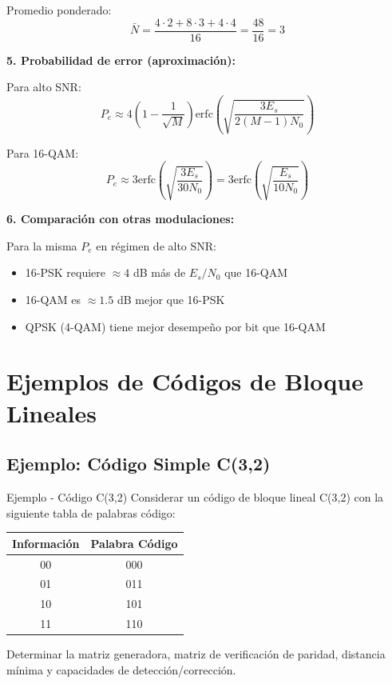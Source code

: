 \documentclass[10pt,a4paper]{article}
\begin{document}
\begin{solucion}
Promedio ponderado:
\[
\bar{N} = \frac{4 \cdot 2 + 8 \cdot 3 + 4 \cdot 4}{16} = \frac{48}{16} = 3
\]

\textbf{5. Probabilidad de error (aproximación):}

Para alto SNR:
\[
P_e \approx 4\left(1 - \frac{1}{\sqrt{M}}\right) \text{erfc}\left(\sqrt{\frac{3E_s}{2(M-1)N_0}}\right)
\]

Para 16-QAM:
\[
\boxed{P_e \approx 3 \text{erfc}\left(\sqrt{\frac{3E_s}{30N_0}}\right) = 3 \text{erfc}\left(\sqrt{\frac{E_s}{10N_0}}\right)}
\]

\textbf{6. Comparación con otras modulaciones:}

Para la misma $P_e$ en régimen de alto SNR:
\begin{itemize}
\item 16-PSK requiere $\approx 4$ dB más de $E_s/N_0$ que 16-QAM
\item 16-QAM es $\approx 1.5$ dB mejor que 16-PSK
\item QPSK (4-QAM) tiene mejor desempeño por bit que 16-QAM
\end{itemize}
\end{solucion}

\section{Ejemplos de Códigos de Bloque Lineales}

\subsection{Ejemplo: Código Simple C(3,2)}

\begin{ejemplo}{Ejemplo - Código C(3,2)}
Considerar un código de bloque lineal C(3,2) con la siguiente tabla de palabras código:

\begin{center}
\begin{tabular}{|c|c|}
\hline
\textbf{Información} & \textbf{Palabra Código} \\
\hline
00 & 000 \\
01 & 011 \\
10 & 101 \\
11 & 110 \\
\hline
\end{tabular}
\end{center}

Determinar la matriz generadora, matriz de verificación de paridad, distancia mínima y capacidades de detección/corrección.
\end{ejemplo}
\end{document}
